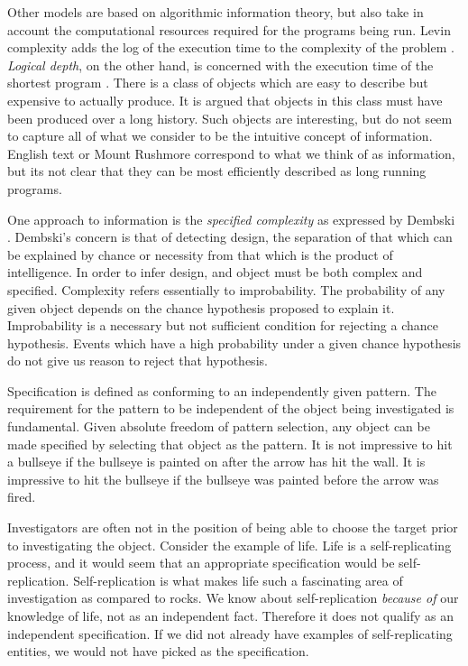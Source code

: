 Other models are based on algorithmic information theory, but also take in account the computational resources required for the programs being run.
Levin complexity adds the log of the execution time to the complexity of the problem \citep{Levin1976}.
\textit{Logical depth}, on the other hand, is concerned with the execution time of the shortest program \citep{Bennett1988}.
There is a class of objects which are easy to describe but expensive to actually produce.
It is argued \citep{Bennett1988} that objects in this class must have been produced over a long history.
Such objects are interesting, but do not seem to capture all of what we consider to be the intuitive concept of information.
English text or Mount Rushmore correspond to what we think of as information, but its not clear that they can be most efficiently described as long running programs.

One approach to information is the \textit{specified complexity} as expressed by Dembski \citep{Dembski1998}.
Dembski's concern is that of detecting design, the separation of that which can be explained by chance or necessity from that which is the product of intelligence. 
In order to infer design, and object must be both complex and specified.
Complexity refers essentially to improbability.
The probability of any given object depends on the chance hypothesis proposed to explain it.
Improbability is a necessary but not sufficient condition for rejecting a chance hypothesis.
Events which have a high probability under a given chance hypothesis do not give us reason to reject that hypothesis.

Specification is defined as conforming to an independently given pattern.
The requirement for the pattern to be independent of the object being investigated is fundamental.
Given absolute freedom of pattern selection, any object can be made specified by selecting that object as the pattern.
It is not impressive to hit a bullseye if the bullseye is painted on after the arrow has hit the wall.
It is impressive to hit the bullseye if the bullseye was painted before the arrow was fired.

Investigators are often not in the position of being able to choose the target prior to investigating the object.
Consider the example of life.
Life is a self-replicating process, and it would seem that an appropriate specification would be self-replication.
Self-replication is what makes life such a fascinating area of investigation as compared to rocks.
We know about self-replication \emph{because of} our knowledge of life, not as an independent fact.
Therefore it does not qualify as an independent specification.
If we did not already have examples of self-replicating entities, we would not have picked as the specification.

